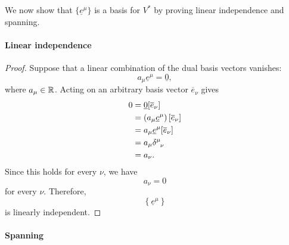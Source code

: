 		We now show that $\{\underline{e}^\mu\}$ is a basis for $V^*$ by proving
		linear independence and spanning.

		\paragraph{Linear independence}

		\begin{proof}
			Suppose that a linear combination of the dual basis vectors vanishes:
			\[
				a_\mu\underline{e}^\mu
				=
				\underline{0},
			\]
			where $a_\mu\in\mathbb{R}$. Acting on an arbitrary basis vector
			$\overline{e}_\nu$ gives
			\begin{align}
				0
				&=
				\underline{0}[\overline{e}_\nu]
				\nonumber\\
				&=
				\left(
					a_\mu\underline{e}^\mu
				\right)
				[\overline{e}_\nu]
				\nonumber\\
				&=
				a_\mu
				\underline{e}^\mu[\overline{e}_\nu]
				\nonumber\\
				&=
				a_\mu
				\tensor{\delta}{^\mu_\nu}
				\nonumber\\
				&=
				a_\nu.
			\end{align}
			Since this holds for every $\nu$, we have
			\[
				a_\nu=0
			\]
			for every $\nu$. Therefore,
			\[
				\left\{
					\underline{e}^\mu
				\right\}
			\]
			is linearly independent.
		\end{proof}

		\paragraph{Spanning}


